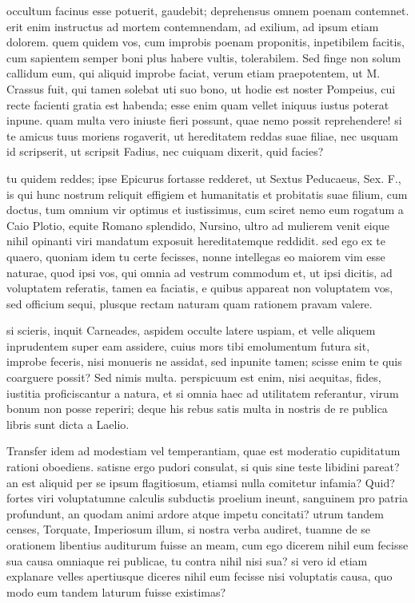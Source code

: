  occultum facinus esse potuerit, gaudebit; deprehensus omnem poenam contemnet. erit enim instructus ad mortem contemnendam, ad exilium, ad ipsum etiam dolorem. quem quidem vos, cum improbis poenam proponitis, inpetibilem facitis, cum sapientem semper boni plus habere vultis, tolerabilem. Sed finge non solum callidum eum, qui aliquid improbe faciat, verum etiam praepotentem, ut M. Crassus fuit, qui tamen solebat uti suo bono, ut hodie est noster Pompeius, cui recte facienti gratia est habenda; esse enim quam vellet iniquus iustus poterat inpune. quam multa vero iniuste fieri possunt, quae nemo possit reprehendere! si te amicus tuus moriens rogaverit, ut hereditatem reddas suae filiae, nec usquam id scripserit, ut scripsit Fadius, nec cuiquam dixerit, quid facies?

 tu quidem reddes; ipse Epicurus fortasse redderet, ut Sextus Peducaeus, Sex. F., is qui hunc nostrum reliquit effigiem et humanitatis et probitatis suae filium, cum doctus, tum omnium vir optimus et iustissimus, cum sciret nemo eum rogatum a Caio Plotio, equite Romano splendido, Nursino, ultro ad mulierem venit eique nihil opinanti viri mandatum exposuit hereditatemque reddidit. sed ego ex te quaero, quoniam idem tu certe fecisses, nonne intellegas eo maiorem vim esse naturae, quod ipsi vos, qui omnia ad vestrum commodum et, ut ipsi dicitis, ad voluptatem referatis, tamen ea faciatis, e quibus appareat non voluptatem vos, sed officium sequi, plusque rectam naturam quam rationem pravam valere.

 si scieris, inquit Carneades, aspidem occulte latere uspiam, et velle aliquem inprudentem super eam assidere, cuius mors tibi emolumentum futura sit, improbe feceris, nisi monueris ne assidat, sed inpunite tamen; scisse enim te quis coarguere possit? Sed nimis multa. perspicuum est enim, nisi aequitas, fides, iustitia proficiscantur a natura, et si omnia haec ad utilitatem referantur, virum bonum non posse reperiri; deque his rebus satis multa in nostris de re publica libris sunt dicta a Laelio.

 Transfer idem ad modestiam vel temperantiam, quae est moderatio cupiditatum rationi oboediens. satisne ergo pudori consulat, si quis sine teste libidini pareat? an est aliquid per se ipsum flagitiosum, etiamsi nulla comitetur infamia? Quid? fortes viri voluptatumne calculis subductis proelium ineunt, sanguinem pro patria profundunt, an quodam animi ardore atque impetu concitati? utrum tandem censes, Torquate, Imperiosum illum, si nostra verba audiret, tuamne de se orationem libentius auditurum fuisse an meam, cum ego dicerem nihil eum fecisse sua causa omniaque rei publicae, tu contra nihil nisi sua? si vero id etiam explanare velles apertiusque diceres nihil eum fecisse nisi voluptatis causa, quo modo eum tandem laturum fuisse existimas?

